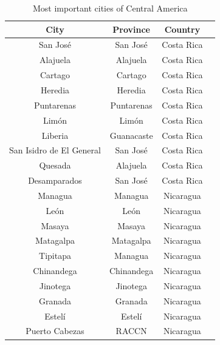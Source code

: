 \documentclass[letterpaper,12pt]{article}
\begin{document}
\begin{longtable}{c c c c }
\caption{Most important cities of Central America} \\
\label{tab:table1}
\textbf{City}                   & \textbf{Province}             & \textbf{Country}  \\
\hline\endhead
\hline \endfoot 
San José                 & San José             & Costa Rica  \\
Alajuela                 & Alajuela             & Costa Rica  \\
Cartago                  & Cartago              & Costa Rica  \\
Heredia                  & Heredia              & Costa Rica  \\
Puntarenas               & Puntarenas           & Costa Rica  \\
Limón                    & Limón                & Costa Rica  \\
Liberia                  & Guanacaste           & Costa Rica  \\
San Isidro de El General & San José             & Costa Rica  \\
Quesada                  & Alajuela             & Costa Rica  \\
Desamparados             & San José             & Costa Rica  \\
Managua                  & Managua              & Nicaragua   \\
León                     & León                 & Nicaragua   \\
Masaya                   & Masaya               & Nicaragua   \\
Matagalpa                & Matagalpa            & Nicaragua   \\
Tipitapa                 & Managua              & Nicaragua   \\
Chinandega               & Chinandega           & Nicaragua   \\
Jinotega                 & Jinotega             & Nicaragua   \\
Granada                  & Granada              & Nicaragua   \\
Estelí                   & Estelí               & Nicaragua   \\
Puerto Cabezas           & RACCN                & Nicaragua   \\

\end{longtable}
\end{document}
